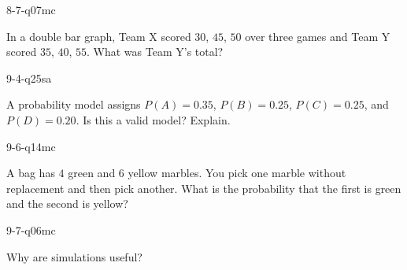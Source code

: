 \begin{practiceQuestion}{8-7-q07}{mc}
\begin{questionText}
In a double bar graph, Team X scored $30$, $45$, $50$ over three games and Team Y scored $35$, $40$, $55$. What was Team Y's total?
\end{questionText}
\end{practiceQuestion}

\begin{practiceQuestion}{9-4-q25}{sa}
\begin{questionText}
A probability model assigns $P(A) = 0.35$, $P(B) = 0.25$, $P(C) = 0.25$, and $P(D) = 0.20$. Is this a valid model? Explain.
\end{questionText}
\end{practiceQuestion}

\begin{practiceQuestion}{9-6-q14}{mc}
\begin{questionText}
A bag has $4$ green and $6$ yellow marbles. You pick one marble without replacement and then pick another. What is the probability that the first is green and the second is yellow?
\end{questionText}
\end{practiceQuestion}

\begin{practiceQuestion}{9-7-q06}{mc}
\begin{questionText}
Why are simulations useful?
\end{questionText}
\end{practiceQuestion}
